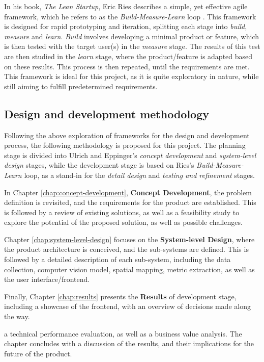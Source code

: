 In his book, \textit{The Lean Startup}, Eric Ries describes a simple, yet effective agile framework, which he refers to as the \textit{Build-Measure-Learn} loop \cite{lean_startup}. This framework is designed for rapid prototyping and iteration, splitting each stage into \textit{build}, \textit{measure} and \textit{learn}. \textit{Build} involves developing a minimal product or feature, which is then tested with the target user(s) in the \textit{measure} stage. The results of this test are then studied in the \textit{learn} stage, where the product/feature is adapted based on these results. This process is then repeated, until the requirements are met. This framework is ideal for this project, as it is quite exploratory in nature, while still aiming to fulfill predetermined requirements.

\subsection{Design and development methodology}

Following the above exploration of frameworks for the design and development process, the following methodology is proposed for this project. The planning stage is divided into Ulrich and
Eppinger's \textit{concept development} and \textit{system-level design} stages, while the development stage is based on Ries's \textit{Build-Measure-Learn} loop, as a stand-in for the \textit{detail design} and \textit{testing and refinement} stages.

In Chapter \ref{chap:concept-development}, \textbf{Concept Development}, the problem definition is revisited, and the requirements for the product are established. This is followed by a review of existing solutions, as well as a feasibility study to explore the potential of the proposed solution, as well as possible challenges.

Chapter \ref{chap:system-level-design} focuses on the \textbf{System-level Design}, where the product architecture is conceived, and the sub-systems are defined. This is followed by a detailed description of each sub-system, including the data collection, computer vision model, spatial mapping, metric extraction, as well as the user interface/frontend.

Finally, Chapter \ref{chap:results} presents the \textbf{Results} of development stage, including a showcase of the frontend, with an overview of decisions made along the way.

a technical performance evaluation, as well as a business value analysis. The chapter concludes with a discussion of the results, and their implications for the future of the product.